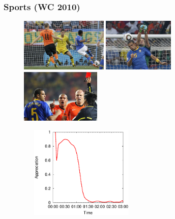 \documentclass[14pt]{beamer}
\begin{document}
\begin{frame}\frametitle{Sports (WC 2010)}

\vspace{-0.1in}
\begin{figure}
\centering
\includegraphics[height=1.00in]{golrobinho.eps}
\includegraphics[height=1.00in]{contra.eps}
\includegraphics[height=1.00in]{vermelho.eps}
\end{figure}

\vspace{-0.15in}
\begin{figure}
\centering
\includegraphics[width=2.35in,height=1.75in]{felipemeloPositividade.eps}
\end{figure}

\end{frame}
\end{document}
